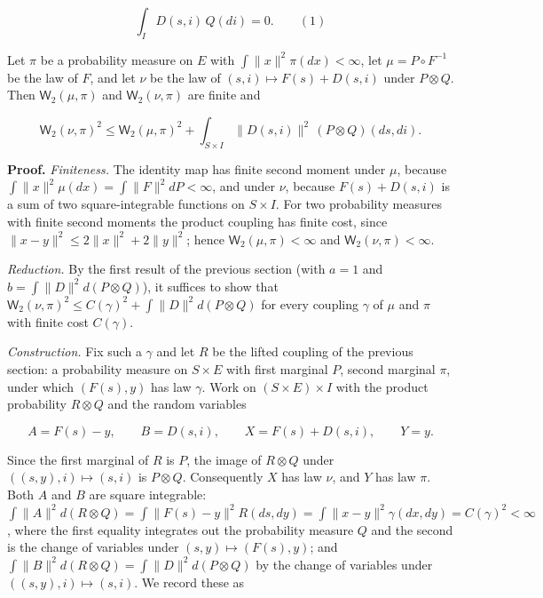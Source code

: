 \documentclass[11pt,a4paper]{report}
\begin{document}
\[\int_ID(s,i)\,Q(di)=0.\qquad(1)\]


Let \(\pi\) be a probability measure on \(E\) with \(\int\|x\|^2\pi(dx)<\infty\), let \(\mu=P\circ F^{-1}\) be the law of \(F\), and let \(\nu\) be the law of \((s,i)\mapsto F(s)+D(s,i)\) under \(P\otimes Q\). Then \(\mathsf W_2(\mu,\pi)\) and \(\mathsf W_2(\nu,\pi)\) are finite and


\[\mathsf W_2(\nu,\pi)^2\le\mathsf W_2(\mu,\pi)^2+\int_{S\times I}\|D(s,i)\|^2\,(P\otimes Q)(ds,di).\]


\textbf{Proof.} \emph{Finiteness.} The identity map has finite second moment under \(\mu\), because \(\int\|x\|^2\mu(dx)=\int\|F\|^2dP<\infty\), and under \(\nu\), because \(F(s)+D(s,i)\) is a sum of two square-integrable functions on \(S\times I\). For two probability measures with finite second moments the product coupling has finite cost, since \(\|x-y\|^2\le2\|x\|^2+2\|y\|^2\); hence \(\mathsf W_2(\mu,\pi)<\infty\) and \(\mathsf W_2(\nu,\pi)<\infty\).




\emph{Reduction.} By the first result of the previous section (with \(a=1\) and \(b=\int\|D\|^2d(P\otimes Q)\)), it suffices to show that \(\mathsf W_2(\nu,\pi)^2\le C(\gamma)^2+\int\|D\|^2d(P\otimes Q)\) for every coupling \(\gamma\) of \(\mu\) and \(\pi\) with finite cost \(C(\gamma)\).




\emph{Construction.} Fix such a \(\gamma\) and let \(R\) be the lifted coupling of the previous section: a probability measure on \(S\times E\) with first marginal \(P\), second marginal \(\pi\), under which \((F(s),y)\) has law \(\gamma\). Work on \((S\times E)\times I\) with the product probability \(R\otimes Q\) and the random variables


\[A=F(s)-y,\qquad B=D(s,i),\qquad X=F(s)+D(s,i),\qquad Y=y.\]


Since the first marginal of \(R\) is \(P\), the image of \(R\otimes Q\) under \(((s,y),i)\mapsto(s,i)\) is \(P\otimes Q\). Consequently \(X\) has law \(\nu\), and \(Y\) has law \(\pi\). Both \(A\) and \(B\) are square integrable: \(\int\|A\|^2d(R\otimes Q)=\int\|F(s)-y\|^2R(ds,dy)=\int\|x-y\|^2\gamma(dx,dy)=C(\gamma)^2<\infty\), where the first equality integrates out the probability measure \(Q\) and the second is the change of variables under \((s,y)\mapsto(F(s),y)\); and \(\int\|B\|^2d(R\otimes Q)=\int\|D\|^2d(P\otimes Q)\) by the change of variables under \(((s,y),i)\mapsto(s,i)\). We record these as
\end{document}
